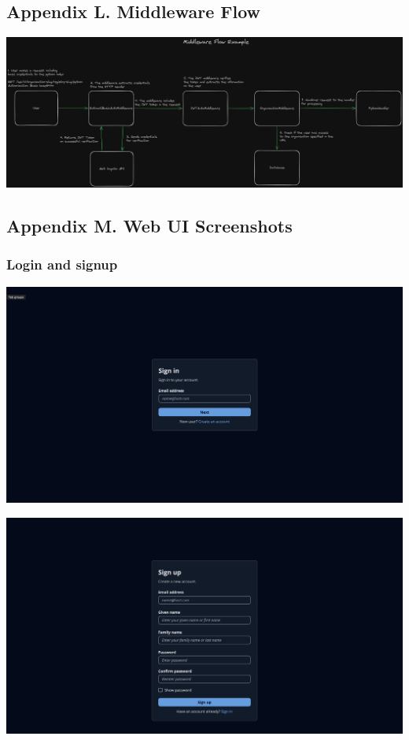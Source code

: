 \documentclass{article}
\begin{document}
  \subsection{Appendix L. Middleware Flow}
  \label{sec:appendix-l}

  {\parindent0pt
    \includegraphics[scale=0.18]{appendix/middleware-flow-python-example.png}
  }

  \subsection{Appendix M. Web UI Screenshots}
  \label{sec:appendix-m}

  \subsubsection{Login and signup}

  \includegraphics[scale=0.28]{screenshots/signin.png}

  \includegraphics[scale=0.28]{screenshots/signup.png}
\end{document}
